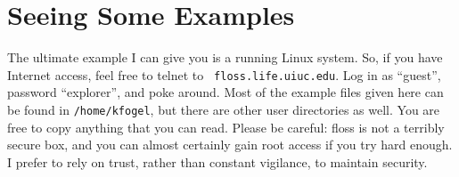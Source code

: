 \section{Seeing Some Examples}


The ultimate example I can give you is a running Linux system.  So, if
you have Internet access, feel free to telnet to {\tt
  floss.life.uiuc.edu}.  Log in as ``guest'', password ``explorer'',
and poke around.  Most of the example files given here can be found in
{\tt /home/kfogel}, but there are other user directories as well.  You
are free to copy anything that you can read.  Please be careful: floss
is not a terribly secure box, and you can almost certainly gain root
access if you try hard enough.  I prefer to rely on trust, rather than
constant vigilance, to maintain security.
